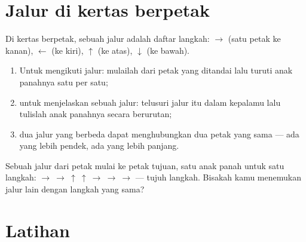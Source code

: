 \section{Jalur di kertas berpetak}

\begin{method}\label{met:g1:shapes:path}
Di kertas berpetak, sebuah jalur adalah daftar langkah:
$\to$ (satu petak ke kanan), $\leftarrow$ (ke kiri), $\uparrow$ (ke
atas), $\downarrow$ (ke bawah).
\begin{enumerate}
  \item Untuk mengikuti jalur: mulailah dari petak yang ditandai lalu
        turuti anak panahnya satu per satu;
  \item untuk menjelaskan sebuah jalur: telusuri jalur itu dalam
        kepalamu lalu tulislah anak panahnya secara berurutan;
  \item dua jalur yang berbeda dapat menghubungkan dua petak yang
        sama --- ada yang lebih pendek, ada yang lebih panjang.
\end{enumerate}
\end{method}

\begin{omfigure}

{\small Sebuah jalur dari petak mulai ke petak tujuan, satu anak
panah untuk satu langkah:
$\to\ \to\ \uparrow\ \uparrow\ \to\ \to\ \to$ --- tujuh langkah.
Bisakah kamu menemukan jalur lain dengan  langkah yang sama?}
\end{omfigure}

\section{Latihan}

